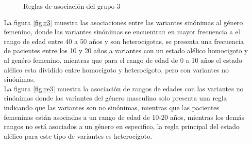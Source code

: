 \begin{figure}[h!]
	\centering
	\caption{Reglas de asociación del grupo 3}\label{fig:reglas3}
\end{figure}

La figura \ref{fig:r3} muestra las asociaciones entre las variantes sinónimas al género femenino, donde las variantes sinónimas se encuentran en mayor frecuencia a el rango de edad entre 40 a 50 años y son heterocigotas, se presenta una frecuencia de pacientes entre los 10 y 20 años a variantes con un estado alélico homocigoto y al genéro femenino, mientras que para el rango de edad de 0 a 10 años el estado alélico esta dividido entre homocigoto y heterocigoto, pero con variantes no sinónimas. \\

La figura \ref{fig:re3} muestra la asociación de rangos de edades con las variantes no sinónimas donde las variantes del género masculino solo presenta una regla indicando que las variantes son no sinónimas, mientras que las pacientes femeninas están asociadas a un rango de edad de 10-20 años, mientras los demás rangos no está asociados a un género en especifico, la regla principal del estado alélico para este tipo de variantes es heterocigoto. \\

